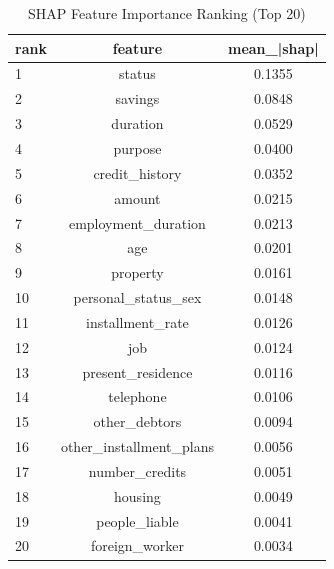 \begin{table}
\centering
\caption{SHAP Feature Importance Ranking (Top 20)}
\label{tab:shap_ranking}
\begin{tabular}{lcc}
\toprule
rank & feature & mean_|shap| \\
\midrule
1 & status & 0.1355 \\
2 & savings & 0.0848 \\
3 & duration & 0.0529 \\
4 & purpose & 0.0400 \\
5 & credit_history & 0.0352 \\
6 & amount & 0.0215 \\
7 & employment_duration & 0.0213 \\
8 & age & 0.0201 \\
9 & property & 0.0161 \\
10 & personal_status_sex & 0.0148 \\
11 & installment_rate & 0.0126 \\
12 & job & 0.0124 \\
13 & present_residence & 0.0116 \\
14 & telephone & 0.0106 \\
15 & other_debtors & 0.0094 \\
16 & other_installment_plans & 0.0056 \\
17 & number_credits & 0.0051 \\
18 & housing & 0.0049 \\
19 & people_liable & 0.0041 \\
20 & foreign_worker & 0.0034 \\
\bottomrule
\end{tabular}
\end{table}
